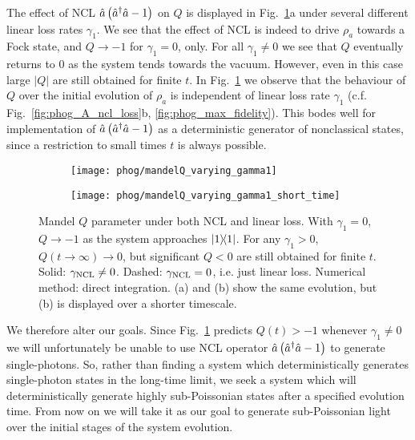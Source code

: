 The effect of NCL $\hat{a}\left(\hat{a}^\dagger \hat{a} - 1\right)$ on $Q$ is displayed in Fig.~\ref{fig:phog_ncl_Q}a under several different linear loss rates $\gamma_1$. We see that the effect of NCL is indeed to drive $\rho_a$ towards a Fock state, and $Q \rightarrow -1$ for $\gamma_1 = 0$, only. For all $\gamma_1 \ne 0$ we see that $Q$ eventually returns to $0$ as the system tends towards the vacuum. However, even in this case large $\left|Q\right|$ are still obtained for finite $t$. In Fig.~\ref{fig:phog_ncl_Q} we observe that the behaviour of $Q$ over the initial evolution of $\rho_a$ is independent of linear loss rate $\gamma_1$ (c.f. Fig.~\ref{fig:phog_A_ncl_loss}b, \ref{fig:phog_max_fidelity}). This bodes well for implementation of $\hat{a}\left(\hat{a}^\dagger \hat{a} - 1\right)$ as a deterministic generator of nonclassical states, since a restriction to small times $t$ is always possible.

\begin{figure}[htp]
\captionsetup{width=0.8\linewidth}
\centering
	\begin{subfigure}{0.7\linewidth}
	\caption{}
	\texttt{[image: phog/mandelQ\_varying\_gamma1]}
	\end{subfigure}
	\begin{subfigure}{0.7\linewidth}
	\caption{}
	\texttt{[image: phog/mandelQ\_varying\_gamma1\_short\_time]}
	\end{subfigure}
\caption{\label{fig:phog_ncl_Q} Mandel $Q$ parameter under both NCL and linear loss. With $\gamma_1=0$, $Q \rightarrow -1$ as the system approaches $\dyad{1}$. For any $\gamma_1 > 0$, $Q\left(t\rightarrow\infty\right) \rightarrow 0$, but significant $Q < 0$ are still obtained for finite $t$. Solid: $\gamma_{\text{NCL}} \ne 0$. Dashed: $\gamma_{\text{NCL}} = 0$, i.e. just linear loss. Numerical method: direct integration. (a) and (b) show the same evolution, but (b) is displayed over a shorter timescale.}
\end{figure}

We therefore alter our goals. Since Fig.~\ref{fig:phog_ncl_Q} predicts $Q\left(t\right) > -1$ whenever $\gamma_1 \ne 0$ we will unfortunately be unable to use NCL operator $\hat{a}\left(\hat{a}^\dagger \hat{a} - 1\right)$ to generate single-photons. So, rather than finding a system which deterministically generates single-photon states in the long-time limit, we seek a system which will deterministically generate highly sub-Poissonian states after a specified evolution time. From now on we will take it as our goal to generate sub-Poissonian light over the initial stages of the system evolution.

